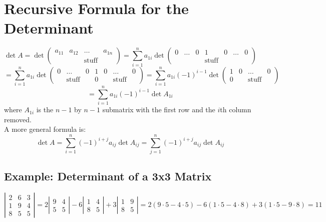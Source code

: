 \documentclass{article}
\theoremstyle{definition}
\begin{document}
\section{Recursive Formula for the Determinant}
\begin{equation*}
	\det A =\det \left(
		\begin{matrix}
			a_{11} & a_{12} & \dots & a_{1n} \\
			& & \text{stuff}
		\end{matrix}
	\right) = \sum_{i=1}^n a_{1i} \det \left(
		\begin{matrix}
			0 & \dots & 0 & 1 & 0 & \dots & 0 \\
			& & & \text{stuff}
		\end{matrix}
	\right)
\end{equation*}
\begin{equation*}
	= \sum_{i=1}^n a_{1i} \det \left(
		\begin{matrix}
			0 & \dots & 0 & 1 & 0 & \dots & 0 \\
			& \text{stuff} & & 0 & & \text{stuff}
		\end{matrix}
	\right) = \sum_{i=1}^n a_{1i} (-1)^{i-1} \det \left(
		\begin{matrix}
			1 & 0 & \dots & 0 \\
			0 & & \text{stuff}
		\end{matrix}
	\right)
\end{equation*}
$$=\sum_{i=1}^n a_{1i}(-1)^{i-1}\det A_{1i}$$
where $A_{1i}$ is the $n-1$ by $n-1$ submatrix with the first row and the $i$th column removed. \\
A more general formula is: \\
$$\det A=\sum_{i=1}^n(-1)^{i+j}a_{ij}\det A_{ij}=\sum_{j=1}^n(-1)^{i+j}a_{ij}\det A_{ij}$$

\subsection{Example: Determinant of a 3x3 Matrix}
\begin{equation*}
	\left|
		\begin{matrix}
			2 & 6 & 3 \\
			1 & 9 & 4 \\
			8 & 5 & 5
		\end{matrix}
	\right| =
	2\left|
		\begin{matrix}
			9 & 4 \\
			5 & 5
		\end{matrix}
	\right| - 6\left|
		\begin{matrix}
			1 & 4 \\
			8 & 5
		\end{matrix}
	\right| + 3\left|
		\begin{matrix}
			1 & 9 \\
			8 & 5
		\end{matrix}
	\right|
	= 2(9\cdot5-4\cdot5)-6(1\cdot5-4\cdot8)+3(1\cdot5-9\cdot8)=11
\end{equation*}
\end{document}
